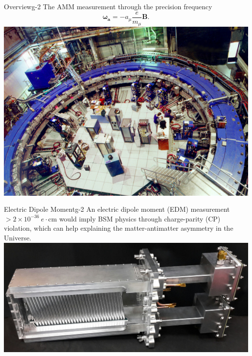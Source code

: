 \documentclass{beamer}
\begin{document}
\begin{frame}{Overview}{g-2}
The AMM measurement through the precision frequency
\begin{equation}
\boldsymbol{\omega_a}=-a_{\mu}\frac{e}{m_{\mu}}\boldsymbol{B}.
\end{equation}
\centering
\includegraphics[height=.5\textheight]{figures/ring.png}
\let\thefootnote\relax{}
\end{frame}


\begin{frame}{Electric Dipole Moment}{g-2}
An electric dipole moment (EDM) measurement $> 2 \times 10^{-36}~e\cdot$cm would imply BSM physics through charge-parity (CP) violation, which can help explaining the matter-antimatter asymmetry in the Universe. \\
\centering
\includegraphics[height=.5\textheight]{figures/tracker.jpg}
\let\thefootnote\relax{}
\end{frame}
    
\end{document}
